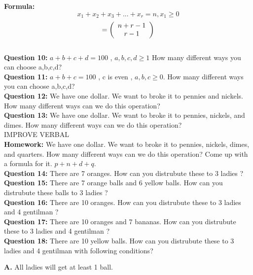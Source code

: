 \documentclass[11pt]{article}
\begin{document}
\textbf{Formula: } $$x_1 + x_2 + x_3 + ... + x_r = n , x_1 \geq 0$$ $$= \left( {\begin{array}{*{20}c} n+r-1 \\ r-1 \\ \end{array}} \right)$$
\\

\textbf{Question 10: }  $a+b+c+d = 100$ , $a,b,c,d \geq 1$ How many different ways you can choose a,b,c,d?
\\ %

\textbf{Question 11: }  $a+b+c = 100$ , c is even , $a,b,c \geq 0$. How many different ways you can choose a,b,c,d?
\\ %

\textbf{Question 12: }  We have one dollar. We want to broke it to pennies and nickels. How many different ways can we do this operation?
\\ %

\textbf{Question 13: }  We have one dollar. We want to broke it to pennies, nickels, and dimes. How many different ways can we do this operation?
\\ %

IMPROVE VERBAL
\\

\textbf{Homework: } We have one dollar. We want to broke it to pennies, nickels, dimes, and quarters. How many different ways can we do this operation? Come up with a formula for it. $p+n+d+q$.
\\ %

\textbf{Question 14: }  There are 7 oranges. How can you distrubute these to 3 ladies ?
\\ %

\textbf{Question 15: }  There are 7 orange balls and 6 yellow balls. How can you distrubute these balls to 3 ladies ?
\\ %

\textbf{Question 16: }  There are 10 oranges. How can you distrubute these to 3 ladies and 4 gentilman ?
\\ %

\textbf{Question 17: }  There are 10 oranges and 7 bananas. How can you distrubute these to 3 ladies and 4 gentilman ?
\\ %

\textbf{Question 18: }  There are 10 yellow balls. How can you distrubute these to 3 ladies and 4 gentilman with following conditions?
\par %
\textbf{A.} All ladies will get at least 1 ball.
\end{document}
